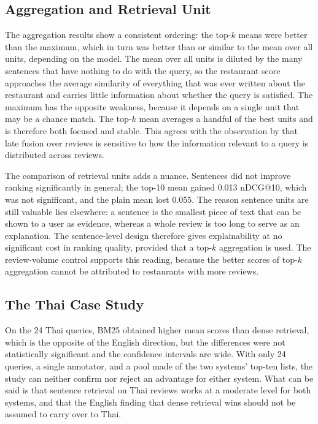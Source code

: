 \subsection{Aggregation and Retrieval Unit}
\label{sec:discaggregation}

The aggregation results show a consistent ordering: the top-$k$ means were better than the maximum, which in turn was better than or similar to the mean over all units, depending on the model. The mean over all units is diluted by the many sentences that have nothing to do with the query, so the restaurant score approaches the average similarity of everything that was ever written about the restaurant and carries little information about whether the query is satisfied. The maximum has the opposite weakness, because it depends on a single unit that may be a chance match. The top-$k$ mean averages a handful of the best units and is therefore both focused and stable. This agrees with the observation by \citet{korikov2024} that late fusion over reviews is sensitive to how the information relevant to a query is distributed across reviews.

The comparison of retrieval units adds a nuance. Sentences did not improve ranking significantly in general; the top-10 mean gained 0.013 nDCG@10, which was not significant, and the plain mean lost 0.055. The reason sentence units are still valuable lies elsewhere: a sentence is the smallest piece of text that can be shown to a user as evidence, whereas a whole review is too long to serve as an explanation. The sentence-level design therefore gives explainability at no significant cost in ranking quality, provided that a top-$k$ aggregation is used. The review-volume control supports this reading, because the better scores of top-$k$ aggregation cannot be attributed to restaurants with more reviews.

\subsection{The Thai Case Study}
\label{sec:discthai}

On the 24 Thai queries, BM25 obtained higher mean scores than dense retrieval, which is the opposite of the English direction, but the differences were not statistically significant and the confidence intervals are wide. With only 24 queries, a single annotator, and a pool made of the two systems' top-ten lists, the study can neither confirm nor reject an advantage for either system. What can be said is that sentence retrieval on Thai reviews works at a moderate level for both systems, and that the English finding that dense retrieval wins should not be assumed to carry over to Thai.

